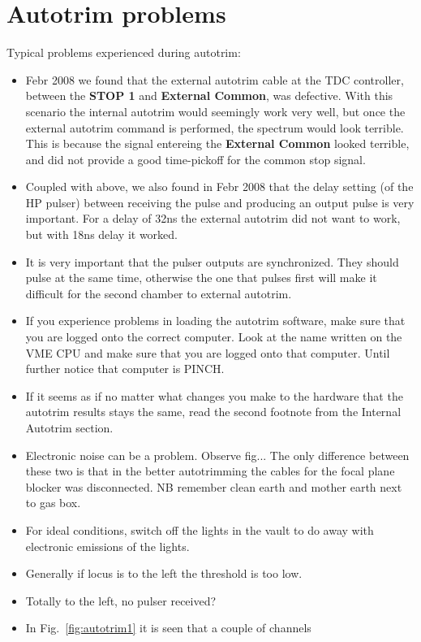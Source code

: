 \documentclass[11pt]{report}
\begin{document}
\section{Autotrim problems}

Typical problems experienced during autotrim:
\begin{itemize}
\item Febr 2008 we found that the external autotrim cable at the TDC controller,
between the {\bf STOP 1} and {\bf External Common}, was defective. With this
scenario  the internal autotrim would seemingly work very well, but once the external
autotrim command is performed, the spectrum would look terrible. This is because the
signal entereing the {\bf External Common} looked terrible, and did not provide
a good time-pickoff for the common stop signal.
\item Coupled with above, we also found in Febr 2008 that the delay setting
(of the HP pulser) between receiving the pulse and producing an output pulse is very 
important. For a delay of 32ns the external autotrim did not want to work, but with
18ns delay it worked.
\item It is very important that the pulser outputs are synchronized. They should
pulse at the same time, otherwise the one that pulses first will make it difficult
for the second chamber to external autotrim.
\item If you experience problems in loading the autotrim software, make
sure that you are logged onto the correct computer. Look at the name
written on the VME CPU and make sure that you are logged onto that computer.
Until further notice that computer is PINCH.
\item If it seems as if no matter what changes you make to the hardware that the
autotrim results stays the same, read the second footnote from the 
Internal Autotrim section.
\item Electronic noise can be a problem. Observe fig...
The only difference between these two is that in the better autotrimming
the cables for the focal plane blocker was disconnected.
NB remember clean earth and mother earth next to gas box.
\item For ideal conditions, switch off the lights in the vault to 
do away with electronic emissions of the lights.
\item Generally if locus is to the left the threshold is too low.
\item Totally to the left, no pulser received?
\item In Fig.~\ref{fig:autotrim1} it is seen that a couple of channels

\end{itemize}
\end{document}
